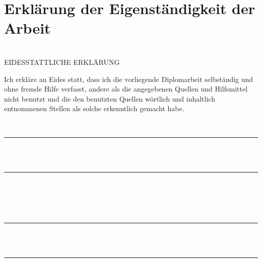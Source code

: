\documentclass[12pt,a4paper]{article}
\newcommand{\mylinespacing}[0]{\onehalfspace}	%
\begin{document}
\mylinespacing
{




\newpage%

\renewcommand{\thesection}{\roman{section}\;}
\section*{\Large\sc Erklärung der Eigenständigkeit der Arbeit}
	\hfill\\[ 8mm]
	EIDESSTATTLICHE ERKLÄRUNG
	\\[3mm]
\begin{spacing}{1.5}
	\noindent%
	Ich erkläre an Eides statt, dass ich die vorliegende Diplomarbeit selbständig und
	ohne fremde Hilfe verfasst, andere als die angegebenen Quellen und Hilfsmittel
	nicht benutzt und die den benutzten Quellen wörtlich und inhaltlich entnommenen
	Stellen als solche erkenntlich gemacht habe.
\end{spacing}\hfill
	\\[12mm]
	\parbox[b]{52mm}{
		\rule{50mm}{0.2pt}\rule{0pt}{25mm}
		\\\hspace*{6mm}{Ort, Datum}
		\\[0mm]
	}
	\hfill
	\parbox[b]{72mm}{
		\rule{70mm}{0.2pt}\rule{0pt}{25mm}
		\\\hspace*{6mm}{Verfasser, Verfasserinnen}
		\\\hspace*{6mm}{Vor- und Zunamen}
	}
		\\[12mm]
	\parbox[b]{52mm}{
		\rule{50mm}{0.2pt}\rule{0pt}{25mm}
		\\\hspace*{6mm}{Ort, Datum}
		\\[0mm]
	}
	\hfill
	\parbox[b]{72mm}{
		\rule{70mm}{0.2pt}\rule{0pt}{25mm}
		\\\hspace*{6mm}{Verfasser, Verfasserinnen}
		\\\hspace*{6mm}{Vor- und Zunamen}
	}






}
\end{document}
